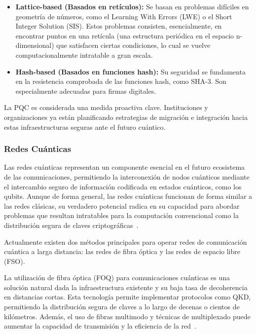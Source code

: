 \begin{itemize}
    \item \textbf{Lattice-based (Basados en retículos):} Se basan en problemas difíciles en geometría de números, como el Learning With Errors (LWE) o el Short Integer Solution (SIS). Estos problemas consisten, esencialmente, en encontrar puntos en una retícula (una estructura periódica en el espacio n-dimensional) que satisfacen ciertas condiciones, lo cual se vuelve computacionalmente intratable a gran escala.

    \item \textbf{Hash-based (Basados en funciones hash):} Su seguridad se fundamenta en la resistencia comprobada de las funciones hash, como SHA-3. Son especialmente adecuadas para firmas digitales.
\end{itemize}

La PQC es considerada una medida proactiva clave. Instituciones y
organizaciones ya están planificando estrategias de migración e integración
hacia estas infraestructuras seguras ante el futuro cuántico.

\subsubsection{Redes Cuánticas}

Las redes cuánticas representan un componente esencial en el futuro ecosistema de las comunicaciones, permitiendo la interconexión de nodos cuánticos mediante el intercambio seguro de información codificada en estados cuánticos, como los qubits. Aunque de forma general, las redes cuánticas funcionan de forma similar a las redes clásicas, su verdadero potencial radica en su capacidad para abordar problemas que resultan intratables para la computación convencional como la distribución segura de claves criptográficas~\cite{VanMeter2014}.

Actualmente existen dos métodos principales para operar redes de comunicación cuántica a larga distancia: las redes de fibra óptica y las redes de espacio libre (FSO).

La utilización de fibra óptica (FOQ) para comunicaciones cuánticas es una solución natural dada la infraestructura existente y su baja tasa de decoherencia en distancias cortas. Esta tecnología permite implementar protocolos como QKD, permitiendo la distribución segura de claves a lo largo de decenas o cientos de kilómetros. Además, el uso de fibras multimodo y técnicas de multiplexado puede aumentar la capacidad de transmisión y la eficiencia de la red~\cite{Malik2015}.

